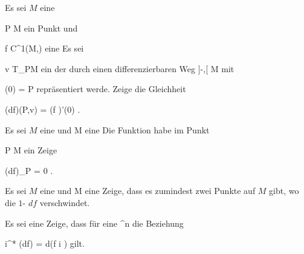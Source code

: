 {}
{

Es sei $M$ eine

\mavergleichskette
{\vergleichskette
{ P
}
{ \in }{ M
}
{  }{
}
{    }{
}
{   }{
}
}
{}{}{}
ein Punkt und

\mavergleichskette
{\vergleichskette
{ f
}
{ \in }{ C^1(M,\R)
}
{  }{
}
{    }{
}
{   }{
}
}
{}{}{}
eine
Es sei

\mavergleichskette
{\vergleichskette
{ v
}
{ \in }{ T_PM
}
{  }{
}
{    }{
}
{   }{
}
}
{}{}{}
ein
der durch einen differenzierbaren Weg
\maabbdisp {\gamma} {{]{-\delta},\delta [}} {M
} {}
mit

\mavergleichskette
{\vergleichskette
{ \gamma(0)
}
{ = }{ P
}
{  }{
}
{    }{
}
{   }{
}
}
{}{}{}
repräsentiert werde. Zeige die Gleichheit

\mavergleichskettedisp
{\vergleichskette
{(df)(P,v)
}
{ =} { (f \circ \gamma)'(0)
}
{ } {
}
{ } {
}
{ } {
}
}
{}{}{.}

}
{} {}

{}
{

Es sei $M$ eine
und
 { M } {\R
} {}
eine
Die Funktion habe im Punkt

\mavergleichskette
{\vergleichskette
{ P
}
{ \in }{ M
}
{  }{
}
{    }{
}
{   }{
}
}
{}{}{}
ein
Zeige

\mavergleichskettedisp
{\vergleichskette
{ (df)_P
}
{ =} { 0
}
{ } {
}
{ } {
}
{ } {
}
}
{}{}{.}

}
{} {}

{}
{

Es sei $M$ eine
und
 { M } {\R
} {}
eine
Zeige, dass es zumindest zwei Punkte auf $M$
 {} {}
gibt, wo die
$1$-
$df$ verschwindet.

}
{} {}

{}
{

Es sei
 eine
Zeige, dass für eine
 {\R^n } {\R
} {}
die Beziehung

\mavergleichskettedisp
{\vergleichskette
{ i^* (df)
}
{ =} { d(f \circ i )
}
{ } {
}
{ } {
}
{ } {
}
}
{}{}{}
gilt.

}
{} {}

